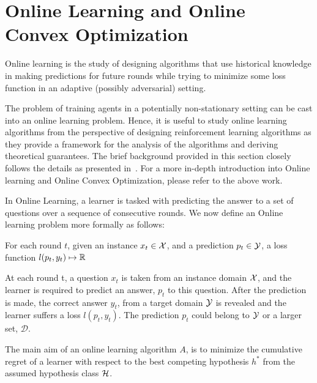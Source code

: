 \section{Online Learning and
  Online Convex Optimization}

Online learning is the study of designing
algorithms that use historical knowledge in making predictions for future rounds while trying to
minimize some loss function in an adaptive (possibly adversarial) setting.

The problem of training agents in a potentially non-stationary setting can be cast into an online
learning problem.
Hence, it is useful to study online learning algorithms from the perspective of designing
reinforcement learning algorithms as they provide a framework for the analysis of the algorithms
and deriving theoretical guarantees.
The brief background provided in this section closely follows the details as presented
in~\cite{shalev-shwartzOnline2012}.
For a more in-depth introduction into Online learning and Online Convex Optimization, please refer
to the above work.

In Online Learning, a learner is tasked with predicting the answer to a set of questions over a
sequence of consecutive rounds.
We now define an Online learning problem more formally as follows:

\begin{definition}
	\label{def:olearning} For each round $t$, given an instance $x_t \in \mathcal{X}$, and
	a prediction $p_t \in \mathcal{Y}$, a loss function $l(p_t, y_t) \mapsto \mathbb{R}$
\end{definition}

At each round t, a question $x_t$ is taken from an instance domain $\mathcal{X}$, and
the learner is required to predict an answer, $p_t$ to this question.
After the prediction is made, the correct answer $y_t$, from a target domain $\mathcal{Y}$ is revealed
and the learner suffers a loss $l(p_t, y_t)$.
The prediction $p_t$ could belong to $\mathcal{Y}$ or a larger set, $\mathcal{D}$.


The main aim of an online learning algorithm $A$, is to minimize the cumulative regret of a learner
with respect to the best competing hypothesis $h^*$ from the assumed hypothesis class $\mathcal{H}$.

